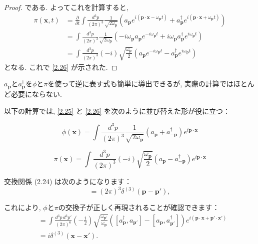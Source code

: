 \documentclass[a4paper,12pt]{article}
\begin{document}
\begin{proof}
である. よってこれを計算すると,
\begin{align*}
    \pi(\mathbf{x}, t) &= \frac{\partial}{\partial t} \int \frac{d^3p}{(2\pi)^3} \frac{1}{\sqrt{2\omega_{\mathbf{p}}}} \left( a_{\mathbf{p}} e^{i(\mathbf{p}\cdot\mathbf{x} - \omega_{\mathbf{p}}t)} + a^\dagger_{\mathbf{p}} e^{i(\mathbf{p}\cdot\mathbf{x} + \omega_{\mathbf{p}}t)} \right) \tag{2-3.g16} \\
    &= \int \frac{d^3p}{(2\pi)^3} \frac{1}{\sqrt{2\omega_{\mathbf{p}}}} \left( -i\omega_{\mathbf{p}} a_{\mathbf{p}} e^{-i\omega_{\mathbf{p}}t} + i\omega_{\mathbf{p}} a^\dagger_{\mathbf{p}} e^{i\omega_{\mathbf{p}}t} \right) \tag{2-3.g17}\\
    &= \int \frac{d^3p}{(2\pi)^3} (-i) \sqrt{\frac{\omega_{\mathbf{p}}}{2}} \left( a_{\mathbf{p}} e^{-i\omega_{\mathbf{p}}t} - a^\dagger_{\mathbf{p}} e^{i\omega_{\mathbf{p}}t} \right) \tag{2-3.g18}
\end{align*}
となる. これで \eqref{2.26} が示された.

\end{proof}

\color{black}

$a_{\mathbf{p}}$と$a^\dagger_{\mathbf{p}}$を$\phi$と$\pi$を使って逆に表す式も簡単に導出できるが, 実際の計算ではほとんど必要にならない.

以下の計算では, \eqref{2.25} と \eqref{2.26} を次のように並び替えた形が役に立つ：

\begin{equation}
\phi(\mathbf{x}) = \int \frac{d^3p}{(2\pi)^3} \frac{1}{\sqrt{2\omega_{\mathbf{p}}}} (a_{\mathbf{p}} + a^\dagger_{-\mathbf{p}}) e^{i\mathbf{p}\cdot\mathbf{x}}
\tag{2.27}
\end{equation}

\begin{equation}
\pi(\mathbf{x}) = \int \frac{d^3p}{(2\pi)^3} \left( -i \right) \sqrt{\frac{\omega_{\mathbf{p}}}{2}} (a_{\mathbf{p}} - a^\dagger_{-\mathbf{p}}) e^{i\mathbf{p}\cdot\mathbf{x}}
\tag{2.28}
\end{equation}

交換関係 (2.24) は次のようになります：
\begin{equation*}
[a_{\mathbf{p}}, a^\dagger_{\mathbf{p}'}] = (2\pi)^3 \delta^{(3)}(\mathbf{p} - \mathbf{p}') ,
\end{equation*}

これにより, $\phi$と$\pi$の交換子が正しく再現されることが確認できます：
\begin{align*}
[\phi(\mathbf{x}), \pi(\mathbf{x}')] &= \int \frac{d^3p\, d^3p'}{(2\pi)^6} \left( -\frac{i}{2} \right) \sqrt{\frac{\omega_{\mathbf{p}'}}{\omega_{\mathbf{p}}}}
\left( [a^\dagger_{\mathbf{p}}, a_{\mathbf{p}'}] - [a_{\mathbf{p}}, a^\dagger_{\mathbf{p}'}] \right)
e^{i(\mathbf{p}\cdot\mathbf{x} + \mathbf{p}'\cdot\mathbf{x}')} \\
&= i\delta^{(3)}(\mathbf{x} - \mathbf{x}') .
\end{align*}
\end{document}
